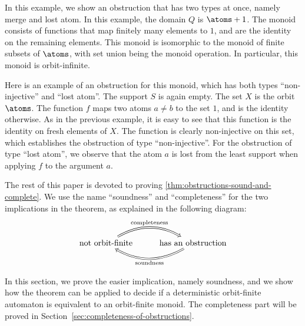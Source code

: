 \begin{myexample}
 In this example, we show an obstruction that has two types at once, namely merge and lost atom. In this example, the domain $Q$ is $\atoms + 1$. The monoid consists of functions that map finitely many elements to $1$, and are the identity on the remaining elements. This monoid is isomorphic to the monoid of finite subsets of $\atoms$, with set union being the monoid operation. In particular, this monoid is orbit-infinite. 

Here is an example of an obstruction for this monoid, which has both  types ``non-injective'' and ``lost atom''. The support $S$ is again empty. The set $X$ is the orbit $\atoms$.  The function $f$ maps two atoms $a \neq b$ to the set $1$, and is the identity otherwise. As in the previous example, it is easy to see that this function is the identity on fresh elements of $X$. The function is clearly non-injective on this set, which establishes the obstruction of type ``non-injective''. For the obstruction of type ``lost atom'', we observe that the atom $a$ is lost from the least support when applying $f$ to the argument $a$.
\end{myexample}


The rest of this paper is devoted to proving \cref{thm:obstructions-sound-and-complete}.
We use the name ``soundness'' and ``completeness'' for the two implications in  the theorem, as explained in the following diagram: 
\[
\begin{tikzcd}
\text{not orbit-finite}
\arrow[r, bend left, Rightarrow, "\text{completeness}"]
& 
\text{has an obstruction}
\arrow[l, bend left, Rightarrow, "\text{soundness}"]
\end{tikzcd}
\]


In this section, we prove the easier implication, namely soundness, and we show how the theorem can be applied to decide if a deterministic orbit-finite automaton is equivalent to an orbit-finite monoid.  The completeness part will be proved in Section~\ref{sec:completeness-of-obstructions}.

